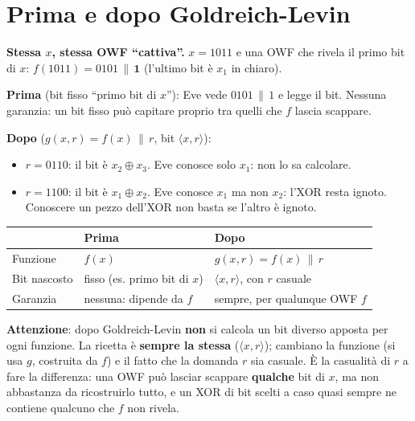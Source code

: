 \section{Prima e dopo Goldreich-Levin}

\begin{esempio}
\textbf{Stessa \(x\), stessa OWF ``cattiva''.} \(x = 1011\) e una OWF che rivela il primo bit di \(x\): \(f(1011) = 0101 \,\|\, \mathbf{1}\) (l'ultimo bit è \(x_1\) in chiaro).

\textbf{Prima} (bit fisso ``primo bit di \(x\)''): Eve vede \(0101 \,\|\, 1\) e legge il bit. Nessuna garanzia: un bit fisso può capitare proprio tra quelli che \(f\) lascia scappare.

\textbf{Dopo} (\(g(x, r) = f(x) \,\|\, r\), bit \(\langle x, r \rangle\)):
\begin{itemize}
  \item \(r = 0110\): il bit è \(x_2 \oplus x_3\). Eve conosce solo \(x_1\): non lo sa calcolare.
  \item \(r = 1100\): il bit è \(x_1 \oplus x_2\). Eve conosce \(x_1\) ma non \(x_2\): l'XOR resta ignoto. Conoscere un pezzo dell'XOR non basta se l'altro è ignoto.
\end{itemize}
\end{esempio}

\begin{center}
\begin{tabular}{lll}
\toprule
 & Prima & Dopo \\
\midrule
Funzione & \(f(x)\) & \(g(x, r) = f(x) \,\|\, r\) \\
Bit nascosto & fisso (es. primo bit di \(x\)) & \(\langle x, r \rangle\), con \(r\) casuale \\
Garanzia & nessuna: dipende da \(f\) & sempre, per qualunque OWF \(f\) \\
\bottomrule
\end{tabular}
\end{center}

\begin{nota}
\textbf{Attenzione}: dopo Goldreich-Levin \textbf{non} si calcola un bit diverso apposta per ogni funzione. La ricetta è \textbf{sempre la stessa} (\(\langle x, r \rangle\)); cambiano la funzione (si usa \(g\), costruita da \(f\)) e il fatto che la domanda \(r\) sia casuale. È la casualità di \(r\) a fare la differenza: una OWF può lasciar scappare \textbf{qualche} bit di \(x\), ma non abbastanza da ricostruirlo tutto, e un XOR di bit scelti a caso quasi sempre ne contiene qualcuno che \(f\) non rivela.
\end{nota}

